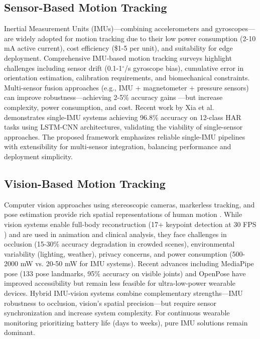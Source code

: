 \subsection{Sensor-Based Motion Tracking}
Inertial Measurement Units (IMUs)---combining accelerometers and gyroscopes---are widely adopted for motion tracking due to their low power consumption (2-10 mA active current), cost efficiency (\$1-5 per unit), and suitability for edge deployment. Comprehensive IMU-based motion tracking surveys \cite{filippeschi2017survey_imu} highlight challenges including sensor drift (0.1-1$^\circ$/s gyroscope bias), cumulative error in orientation estimation, calibration requirements, and biomechanical constraints. Multi-sensor fusion approaches (e.g., IMU + magnetometer + pressure sensors) can improve robustness---achieving 2-5\% accuracy gains \cite{filippeschi2017survey_imu}---but increase complexity, power consumption, and cost. Recent work by Xia et al. \cite{xia2020lstm_har} demonstrates single-IMU systems achieving 96.8\% accuracy on 12-class HAR tasks using LSTM-CNN architectures, validating the viability of single-sensor approaches. The proposed framework emphasizes reliable single-IMU pipelines with extensibility for multi-sensor integration, balancing performance and deployment simplicity.

\subsection{Vision-Based Motion Tracking}
Computer vision approaches using stereoscopic cameras, markerless tracking, and pose estimation provide rich spatial representations of human motion \cite{article:motion_tracking_using_vision}. While vision systems enable full-body reconstruction (17+ keypoint detection at 30 FPS \cite{web:Google_Mediapipe}) and are used in animation and clinical analysis, they face challenges in occlusion (15-30\% accuracy degradation in crowded scenes), environmental variability (lighting, weather), privacy concerns, and power consumption (500-2000 mW vs. 20-50 mW for IMU systems). Recent advances including MediaPipe pose \cite{web:Google_Mediapipe} (133 pose landmarks, 95\% accuracy on visible joints) and OpenPose have improved accessibility but remain less feasible for ultra-low-power wearable devices. Hybrid IMU-vision systems \cite{wan2021deep_har_review} combine complementary strengths---IMU robustness to occlusion, vision's spatial precision---but require sensor synchronization and increase system complexity. For continuous wearable monitoring prioritizing battery life (days to weeks), pure IMU solutions remain dominant.

